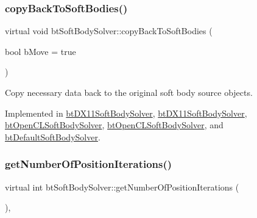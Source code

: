 \mbox{\label{classbtSoftBodySolver_ac4034ba178cb75bd880a44958eaa38d1}} 
\subsubsection{\texorpdfstring{copy\+Back\+To\+Soft\+Bodies()}{copyBackToSoftBodies()}}
{\footnotesize\ttfamily virtual void bt\+Soft\+Body\+Solver\+::copy\+Back\+To\+Soft\+Bodies (\begin{DoxyParamCaption}\item[{bool}]{b\+Move = {\ttfamily true} }\end{DoxyParamCaption})\hspace{0.3cm}{\ttfamily [pure virtual]}}

Copy necessary data back to the original soft body source objects. 

Implemented in \hyperlink{classbtDX11SoftBodySolver_a0364c3791bd12386e32e9357546aeee0}{bt\+D\+X11\+Soft\+Body\+Solver}, \hyperlink{classbtDX11SoftBodySolver_aa0f25b116d336dabb716c8cd08f940b7}{bt\+D\+X11\+Soft\+Body\+Solver}, \hyperlink{classbtOpenCLSoftBodySolver_ab5490d39c1bf489ed33d6e6a4582f93b}{bt\+Open\+C\+L\+Soft\+Body\+Solver}, \hyperlink{classbtOpenCLSoftBodySolver_a374b440216ba03aa39db58e23280c08c}{bt\+Open\+C\+L\+Soft\+Body\+Solver}, and \hyperlink{classbtDefaultSoftBodySolver_ad56d843b5c510c0cb1e2399e20ab212a}{bt\+Default\+Soft\+Body\+Solver}.

\mbox{\label{classbtSoftBodySolver_a814e9da6744f13f47613903e6fee5587}} 
\subsubsection{\texorpdfstring{get\+Number\+Of\+Position\+Iterations()}{getNumberOfPositionIterations()}}
{\footnotesize\ttfamily virtual int bt\+Soft\+Body\+Solver\+::get\+Number\+Of\+Position\+Iterations (\begin{DoxyParamCaption}{ }\end{DoxyParamCaption})\hspace{0.3cm}{\ttfamily [inline]}, {\ttfamily [virtual]}}

